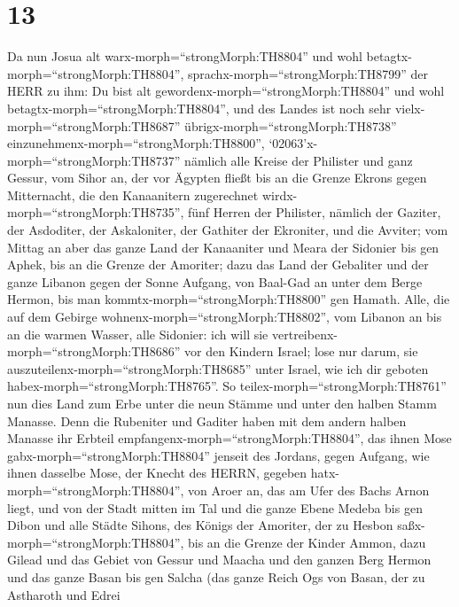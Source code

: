 \hypertarget{section-12}{%
\section{13}\label{section-12}}

 Da nun Josua alt warx-morph=``strongMorph:TH8804'' und wohl
betagtx-morph=``strongMorph:TH8804'',
sprachx-morph=``strongMorph:TH8799'' der HERR zu ihm: Du bist alt
gewordenx-morph=``strongMorph:TH8804'' und wohl
betagtx-morph=``strongMorph:TH8804'', und des Landes ist noch sehr
vielx-morph=``strongMorph:TH8687'' übrigx-morph=``strongMorph:TH8738''
einzunehmenx-morph=``strongMorph:TH8800'', 
`02063'x-morph=``strongMorph:TH8737'' nämlich alle Kreise der Philister
und ganz Gessur,  vom Sihor an, der vor Ägypten fließt bis
an die Grenze Ekrons gegen Mitternacht, die den Kanaanitern zugerechnet
wirdx-morph=``strongMorph:TH8735'', fünf Herren der Philister, nämlich
der Gaziter, der Asdoditer, der Askaloniter, der Gathiter der Ekroniter,
und die Avviter;  vom Mittag an aber das ganze Land der
Kanaaniter und Meara der Sidonier bis gen Aphek, bis an die Grenze der
Amoriter;  dazu das Land der Gebaliter und der ganze Libanon
gegen der Sonne Aufgang, von Baal-Gad an unter dem Berge Hermon, bis man
kommtx-morph=``strongMorph:TH8800'' gen Hamath.  Alle, die
auf dem Gebirge wohnenx-morph=``strongMorph:TH8802'', vom Libanon an bis
an die warmen Wasser, alle Sidonier: ich will sie
vertreibenx-morph=``strongMorph:TH8686'' vor den Kindern Israel; lose
nur darum, sie auszuteilenx-morph=``strongMorph:TH8685'' unter Israel,
wie ich dir geboten habex-morph=``strongMorph:TH8765''.  So
teilex-morph=``strongMorph:TH8761'' nun dies Land zum Erbe unter die
neun Stämme und unter den halben Stamm Manasse.  Denn die
Rubeniter und Gaditer haben mit dem andern halben Manasse ihr Erbteil
empfangenx-morph=``strongMorph:TH8804'', das ihnen Mose
gabx-morph=``strongMorph:TH8804'' jenseit des Jordans, gegen Aufgang,
wie ihnen dasselbe Mose, der Knecht des HERRN, gegeben
hatx-morph=``strongMorph:TH8804'',  von Aroer an, das am
Ufer des Bachs Arnon liegt, und von der Stadt mitten im Tal und die
ganze Ebene Medeba bis gen Dibon  und alle Städte Sihons,
des Königs der Amoriter, der zu Hesbon
saßx-morph=``strongMorph:TH8804'', bis an die Grenze der Kinder Ammon,
 dazu Gilead und das Gebiet von Gessur und Maacha und den
ganzen Berg Hermon und das ganze Basan bis gen Salcha  (das
ganze Reich Ogs von Basan, der zu Astharoth und Edrei
